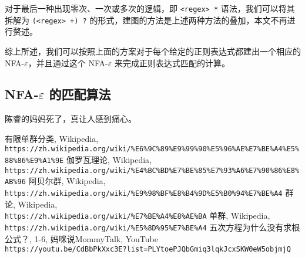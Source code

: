 \documentclass[hyperref,UTF8,12pt,a4paper]{ctexart}
\begin{document}
对于最后一种出现零次、一次或多次的逻辑，即 \verb|<regex> *| 语法，我们可以将其拆解为 \verb|(<regex> +) ?| 的形式，建图的方法是上述两种方法的叠加，本文不再进行赘述。

综上所述，我们可以按照上面的方案对于每个给定的正则表达式都建出一个相应的 NFA-$\varepsilon$，并且通过这个 NFA-$\varepsilon$ 来完成正则表达式匹配的计算。

\subsection{NFA-$\varepsilon$ 的匹配算法}

陈睿的妈妈死了，真让人感到痛心。

\newpage



\begin{thebibliography}{99}
 有限单群分类, Wikipedia, \\
\texttt{https://zh.wikipedia.org/wiki/\%E6\%9C\%89\%E9\%99\%90\%E5\%96\%AE\%E7\%BE\%A4\%E5\%88\%86\%E9\%A1\%9E}
 伽罗瓦理论, Wikipedia, \\
\texttt{https://zh.wikipedia.org/wiki/\%E4\%BC\%BD\%E7\%BE\%85\%E7\%93\%A6\%E7\%90\%86\%E8\%AB\%96}
 阿贝尔群, Wikipedia, \\
\texttt{https://zh.wikipedia.org/wiki/\%E9\%98\%BF\%E8\%B4\%9D\%E5\%B0\%94\%E7\%BE\%A4}
 群论, Wikipedia, \\
\texttt{https://zh.wikipedia.org/wiki/\%E7\%BE\%A4\%E8\%AE\%BA}
 单群, Wikipedia, \\
\texttt{https://zh.wikipedia.org/wiki/\%E5\%8D\%95\%E7\%BE\%A4}
 五次方程为什么没有求根公式？, 1-6, 妈咪说MommyTalk, YouTube \\
\texttt{https://youtu.be/CdBbPkXxc3E?list=PLYtoePJQbGmiq3lqkJcxSKW0eW5objmjQ}

\end {thebibliography}
\end{document}

